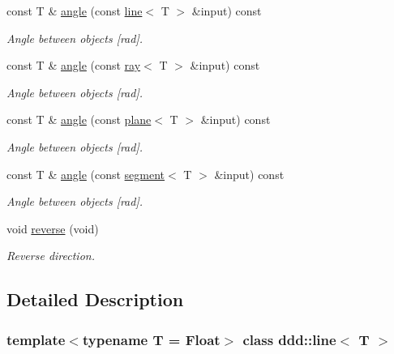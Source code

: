\begin{DoxyCompactItemize}
const T \& \hyperlink{classddd_1_1line_a3ce8f1109a657e646d0c334b19c79f53}{angle} (const \hyperlink{classddd_1_1line}{line}$<$ T $>$ \&input) const
\begin{DoxyCompactList}\small\item\em Angle between objects \mbox{[}rad\mbox{]}. \end{DoxyCompactList}\item 
const T \& \hyperlink{classddd_1_1line_a0d122a300125cbce9b756ed55977c5eb}{angle} (const \hyperlink{classddd_1_1ray}{ray}$<$ T $>$ \&input) const
\begin{DoxyCompactList}\small\item\em Angle between objects \mbox{[}rad\mbox{]}. \end{DoxyCompactList}\item 
const T \& \hyperlink{classddd_1_1line_a3f7bf21d9f2338f9cc5538b6269ff603}{angle} (const \hyperlink{classddd_1_1plane}{plane}$<$ T $>$ \&input) const
\begin{DoxyCompactList}\small\item\em Angle between objects \mbox{[}rad\mbox{]}. \end{DoxyCompactList}\item 
const T \& \hyperlink{classddd_1_1line_a2dff36dabec19d440e5e8069cfe830df}{angle} (const \hyperlink{classddd_1_1segment}{segment}$<$ T $>$ \&input) const
\begin{DoxyCompactList}\small\item\em Angle between objects \mbox{[}rad\mbox{]}. \end{DoxyCompactList}\item 
\mbox{\label{classddd_1_1line_a36cde9b50348cd4926a232c4803f4784}} 
void \hyperlink{classddd_1_1line_a36cde9b50348cd4926a232c4803f4784}{reverse} (void)
\begin{DoxyCompactList}\small\item\em Reverse direction. \end{DoxyCompactList}\end{DoxyCompactItemize}


\subsection{Detailed Description}
\subsubsection*{template$<$typename T = Float$>$\newline
class ddd\+::line$<$ T $>$}

